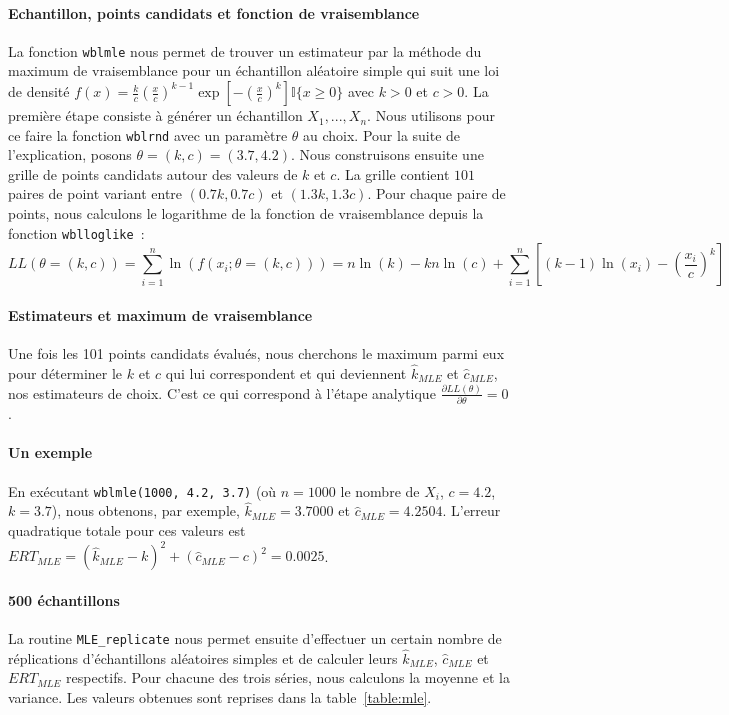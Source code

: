 \paragraph{Echantillon, points candidats et fonction de vraisemblance}
La fonction \texttt{wblmle} nous permet de trouver un estimateur par la méthode du maximum de vraisemblance pour un échantillon aléatoire simple qui suit une loi de densité
$ f(x)= \frac{k}{c} \left(\frac{x}{c}\right)^{k-1} \exp \left[ -\left(\frac{x}{c}\right)^{k}\right] \mathbb{I}\{x \geq 0\}$ avec $k>0$ et $c>0$.
La première étape consiste à générer un échantillon $X_1,...,X_n$. Nous utilisons pour ce faire la fonction \texttt{wblrnd} avec un paramètre  $\theta$ au choix. Pour la suite de l'explication, posons $\theta = (k,c) = (3.7, 4.2)$. Nous construisons ensuite une grille de points candidats autour des valeurs de $k$ et $c$. La grille contient $101$ paires de point variant entre $(0.7k, 0.7c)$ et $(1.3k, 1.3c)$. Pour chaque paire de points, nous calculons le logarithme de la fonction de vraisemblance depuis la fonction \texttt{wblloglike}~:
$$LL(\theta=(k,c)) = \sum_{i=1}^{n}{\ln(f(x_i;\theta=(k,c)))} = n\ln(k) - kn\ln(c) + \sum_{i=1}^{n}{\left[(k-1)\ln(x_i) - \left(\frac{x_i}{c}\right)^{k}\right]}$$

\paragraph{Estimateurs et maximum de vraisemblance} Une fois les 101 points candidats évalués, nous cherchons le maximum parmi eux pour déterminer le $k$ et $c$ qui lui correspondent et qui deviennent $\hat{k}_{MLE}$ et $\hat{c}_{MLE}$, nos estimateurs de choix. C'est ce qui correspond à l'étape analytique $\frac{\partial LL(\theta)}{\partial \theta} = 0$.

\paragraph{Un exemple} En exécutant \texttt{wblmle(1000, 4.2, 3.7)} (où $n = 1000$ le nombre de $X_i$, $c = 4.2$, $k = 3.7$), nous obtenons, par exemple, $\hat{k}_{MLE} = 3.7000$ et $\hat{c}_{MLE} = 4.2504$.
L'erreur quadratique totale pour ces valeurs est $ERT_{MLE} = (\hat{k}_{MLE} - k)^2 + (\hat{c}_{MLE} - c)^2 = 0.0025$.

\paragraph{500 \'echantillons} La routine \texttt{MLE\_replicate} nous permet ensuite d'effectuer un certain nombre de réplications d'échantillons aléatoires simples et de calculer leurs $\hat{k}_{MLE}$, $\hat{c}_{MLE}$ et $ERT_{MLE}$ respectifs. Pour chacune des trois séries, nous calculons la moyenne et la variance. Les valeurs obtenues sont reprises dans la table~\ref{table:mle}.

